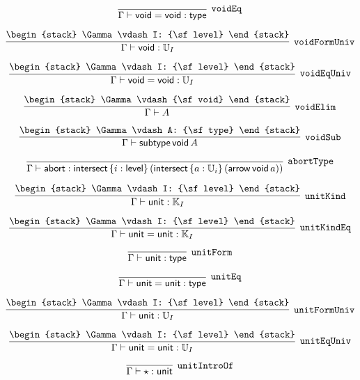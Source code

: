 \[
\infer[{\tt voidEq}]{\Gamma \vdash {\sf void}= {\sf void}: {\sf type}}{}
\]

\[
\infer[{\tt voidFormUniv}]{\Gamma \vdash {\sf void}: {\Bbb U}_{I}}{
\begin{stack}
\Gamma \vdash I: {\sf level}
\end{stack}}
\]

\[
\infer[{\tt voidEqUniv}]{\Gamma \vdash {\sf void}= {\sf void}: {\Bbb U}_{I}}{
\begin{stack}
\Gamma \vdash I: {\sf level}
\end{stack}}
\]

\[
\infer[{\tt voidElim}]{\Gamma \vdash A}{
\begin{stack}
\Gamma \vdash {\sf void}
\end{stack}}
\]

\[
\infer[{\tt voidSub}]{\Gamma \vdash {\sf subtype}\,{\sf void}\,A}{
\begin{stack}
\Gamma \vdash A: {\sf type}
\end{stack}}
\]

\[
\infer[{\tt abortType}]{\Gamma \vdash {\sf abort}: {\sf intersect}\,\{i : {\sf level}\}\,({\sf intersect}\,\{a : {\Bbb U}_{i}\}\,({\sf arrow}\,{\sf void}\,a))}{}
\]

\[
\infer[{\tt unitKind}]{\Gamma \vdash {\sf unit}: {\Bbb K}_{I}}{
\begin{stack}
\Gamma \vdash I: {\sf level}
\end{stack}}
\]

\[
\infer[{\tt unitKindEq}]{\Gamma \vdash {\sf unit}= {\sf unit}: {\Bbb K}_{I}}{
\begin{stack}
\Gamma \vdash I: {\sf level}
\end{stack}}
\]

\[
\infer[{\tt unitForm}]{\Gamma \vdash {\sf unit}: {\sf type}}{}
\]

\[
\infer[{\tt unitEq}]{\Gamma \vdash {\sf unit}= {\sf unit}: {\sf type}}{}
\]

\[
\infer[{\tt unitFormUniv}]{\Gamma \vdash {\sf unit}: {\Bbb U}_{I}}{
\begin{stack}
\Gamma \vdash I: {\sf level}
\end{stack}}
\]

\[
\infer[{\tt unitEqUniv}]{\Gamma \vdash {\sf unit}= {\sf unit}: {\Bbb U}_{I}}{
\begin{stack}
\Gamma \vdash I: {\sf level}
\end{stack}}
\]

\[
\infer[{\tt unitIntroOf}]{\Gamma \vdash \star : {\sf unit}}{}
\]

